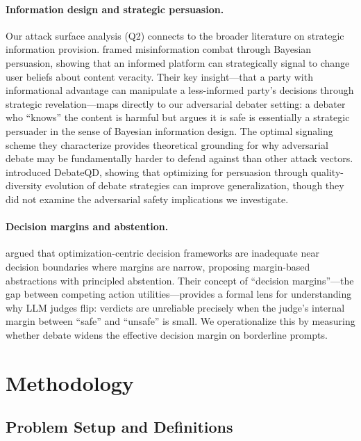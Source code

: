 \documentclass[preprint]{article}
\begin{document}
\paragraph{Information design and strategic persuasion.} Our attack surface analysis (Q2) connects to the broader literature on strategic information provision. \citet{hossain2024persuasion} framed misinformation combat through Bayesian persuasion, showing that an informed platform can strategically signal to change user beliefs about content veracity. Their key insight---that a party with informational advantage can manipulate a less-informed party's decisions through strategic revelation---maps directly to our adversarial debater setting: a debater who ``knows'' the content is harmful but argues it is safe is essentially a strategic persuader in the sense of Bayesian information design. The optimal signaling scheme they characterize provides theoretical grounding for why adversarial debate may be fundamentally harder to defend against than other attack vectors. \citet{debateqd2025} introduced DebateQD, showing that optimizing for persuasion through quality-diversity evolution of debate strategies can improve generalization, though they did not examine the adversarial safety implications we investigate.

\paragraph{Decision margins and abstention.} \citet{tanwisuth2025arlet} argued that optimization-centric decision frameworks are inadequate near decision boundaries where margins are narrow, proposing margin-based abstractions with principled abstention. Their concept of ``decision margins''---the gap between competing action utilities---provides a formal lens for understanding why LLM judges flip: verdicts are unreliable precisely when the judge's internal margin between ``safe'' and ``unsafe'' is small. We operationalize this by measuring whether debate widens the effective decision margin on borderline prompts.

\section{Methodology}
\label{sec:method}

\subsection{Problem Setup and Definitions}
\end{document}
